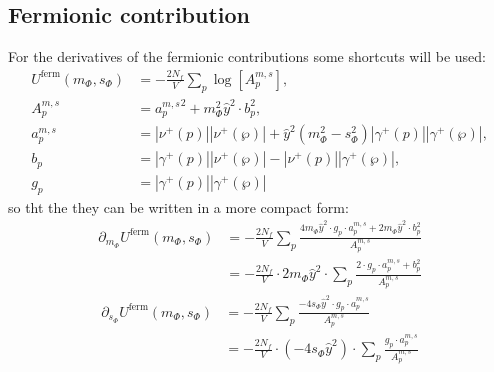 \subsection*{Fermionic contribution}
For the derivatives of the fermionic contributions some shortcuts will be used:
\begin{align}\label{eq:CEP_ferionicContribution_shortcuts}
 U^{\text{ferm}}(m_{\Phi}, s_{\Phi}) &= -\frac{2N_f}{V} \sum\limits_p \log\left[{A_p^{m, s}}\right],
                    \\ \label{eq:CEP_ferionicContribution_shortcuts_A}
 {A_p^{m, s}} &= {a_p^{m,s}}^2 +  m_{\Phi}^2 \hat y^2 \cdot b_p^2 ,
                    \\ \label{eq:CEP_ferionicContribution_shortcuts_a}
 {a_p^{m,s}} &= |\nu^+(p)| |\nu^+(\wp)|   +   \hat y ^2 \left( m_{\Phi}^2 - s_{\Phi}^2 \right) |\gamma^+(p)| |\gamma^+(\wp)|,
                    \\ \label{eq:CEP_ferionicContribution_shortcuts_b}
 b_p                     &= |\gamma^+(p)| |\nu^+(\wp)|   -   |\nu^+(p)| |\gamma^+(\wp)|, 
                    \\ \label{eq:CEP_ferionicContribution_shortcuts_g}
 g_p                     &=  |\gamma^+(p)| |\gamma^+(\wp)|
\end{align}
so tht the they can be written in a more compact form:
\begin{align}\label{eq:CEP_derivative_dm_fermionicContribution}
 \partial_{m_{\Phi}}  U^{\text{ferm}}(m_{\Phi}, s_{\Phi}) &= -\frac{2N_f}{V} \sum\limits_p
                   \frac{4 m_{\Phi} \hat y^2 \cdot g_p \cdot {a_p^{m,s}}   +   2 m_{\Phi} \hat y^2 \cdot b_p^2}
                   { {A_p^{m, s}} } 
       \nonumber \\
%                    
            &= -\frac{2N_f}{V} \cdot 2 m_{\Phi} \hat y^2 \cdot \sum\limits_p 
                   \frac{2 \cdot g_p \cdot {a_p^{m,s}} + b_p^2}{ {A_p^{m, s}} }
\end{align} 
\begin{align}\label{eq:CEP_derivative_ds_fermionicContribution}
 \partial_{s_{\Phi}}  U^{\text{ferm}}(m_{\Phi}, s_{\Phi}) &= -\frac{2N_f}{V} \sum\limits_p
                   \frac{- 4 s_{\Phi} \hat y^2 \cdot g_p \cdot {a_p^{m,s}} }
                   { {A_p^{m, s}} } 
       \nonumber \\
%                    
            &= -\frac{2N_f}{V} \cdot \left( -4 s_{\Phi} \hat y^2\right) \cdot \sum\limits_p 
                   \frac{ g_p \cdot {a_p^{m,s}} }{ {A_p^{m, s}} }
\end{align} 
